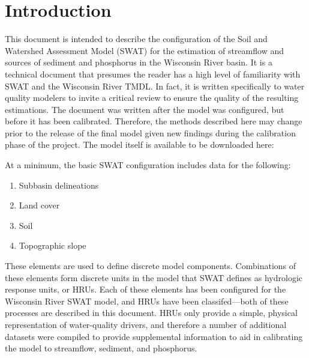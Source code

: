 \section{Introduction}
This document is intended to describe the configuration of the Soil and
Watershed Assessment Model (SWAT) for the estimation of streamflow and sources
of sediment and phosphorus in the Wisconsin River basin. It is a technical
document that presumes the reader has a high level of familiarity with SWAT and
the Wisconsin River TMDL. In fact, it is written specifically to water quality
modelers to invite a critical review to ensure the quality of the resulting
estimations. The document was written after the model was configured, but before
it has been calibrated. Therefore, the methods described here may change prior
to the release of the final model given new findings during the calibration
phase of the project. The model itself is available to be downloaded here:

At a minimum, the basic SWAT configuration includes data for the following:

\begin{enumerate}
	\item Subbasin delineations
	\item Land cover
	\item Soil
	\item Topographic slope
\end{enumerate}

These elements are used to define discrete model components. Combinations of
these elements form discrete units in the model that SWAT defines as hydrologic
response units, or HRUs. Each of these elements has been configured for the
Wisconsin River SWAT model, and HRUs have been classifed---both of these
processes are described in this document. HRUs only provide a simple, physical
representation of water-quality drivers, and therefore a number of additional
datasets were compiled to provide supplemental information to aid in calibrating
the model to streamflow, sediment, and phosphorus.

